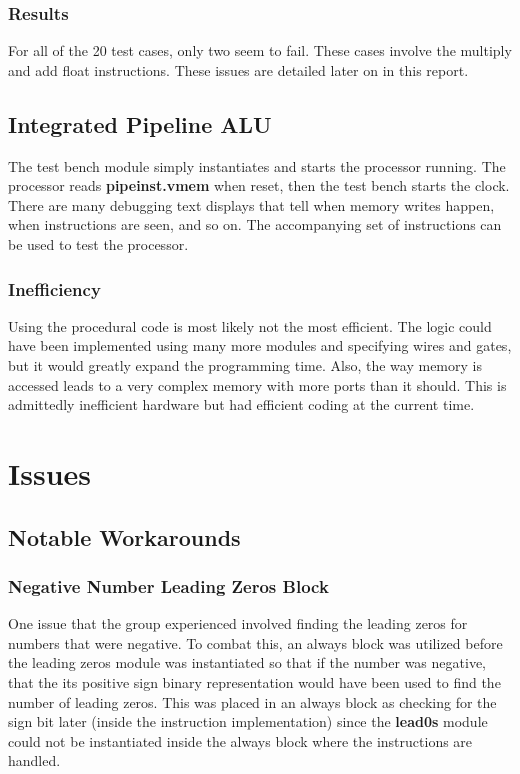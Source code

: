 \documentclass[conference]{IEEEtran}
\begin{document}
\subsubsection{Results}
For all of the 20 test cases, only two seem to fail. These cases involve the multiply and add float instructions. These issues are detailed later on in this report. 


\subsection{Integrated Pipeline ALU }
The test bench module simply instantiates and starts the processor running. The processor reads
\textbf{pipeinst.vmem} when reset, then the test bench starts the clock. There are many debugging text displays that tell when memory writes happen, when instructions are seen, and so on. The accompanying set of instructions can be used to test the processor.

\subsubsection{Inefficiency}
Using the procedural code is most likely not the most efficient. The logic could have been implemented
using many more modules and specifying wires and gates, but it would greatly expand the programming
time. Also, the way memory is accessed leads to a very complex memory with more ports than it should.
This is admittedly inefficient hardware but had efficient coding at the current time.

\section{Issues}
\subsection{Notable Workarounds}
\subsubsection{Negative Number Leading Zeros Block}
One issue that the group experienced involved finding the leading zeros for numbers that were 
negative. To combat this, an always block was utilized before the leading zeros module was instantiated
so that if the number was negative, that the its positive sign binary representation would have been
used to find the number of leading zeros. This was placed in an always block as checking for the sign bit later 
(inside the instruction implementation) since the \textbf{lead0s} module could not be instantiated inside
the always block where the instructions are handled. 
\end{document}

